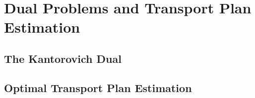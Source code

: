 \chapter{Dual Problems and Transport Plan Estimation}\label{DualPlanEst}

\section{The Kantorovich Dual}\label{KanDual}

\section{Optimal Transport Plan Estimation}\label{OTPlanEst}

